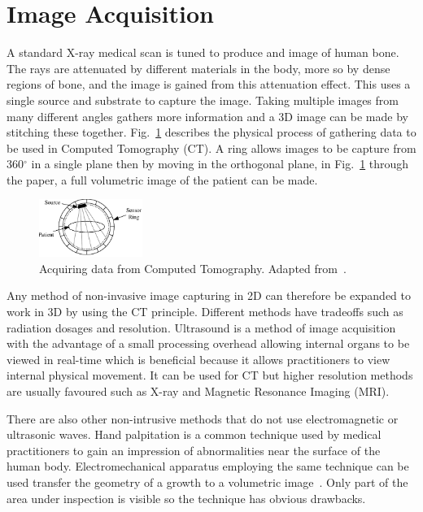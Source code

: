 \documentclass[journal]{IEEEtran}
\begin{document}
\section{Image Acquisition}
\label{sec:image}

A standard X-ray medical scan is tuned to produce and image of human bone.
The rays are attenuated by different materials in the body, more so by dense regions of bone, and the image is gained from this attenuation effect.  
This uses a single source and substrate to capture the image.
Taking multiple images from many different angles gathers more information and a 3D image can be made by stitching these together.
Fig.~\ref{fig:ct} describes the physical process of gathering data to be used in Computed Tomography (CT).
A ring allows images to be capture from 360$^{\circ}$ in a single plane then by moving in the orthogonal plane, in Fig.~\ref{fig:ct} through the paper, a full volumetric image of the patient can be made. 

\begin{figure}[!htb]
   \centering
   \includegraphics[width = 0.3\textwidth]{Figures/CT.pdf}
   \caption{Acquiring data from Computed Tomography. Adapted from~\cite{kayvan2006biomedical}.}
   \label{fig:ct}
\end{figure}

Any method of non-invasive image capturing in 2D can therefore be expanded to work in 3D by using the CT principle.
Different methods have tradeoffs such as radiation dosages and resolution.
Ultrasound is a method of image acquisition with the advantage of a small processing overhead allowing internal organs to be viewed in real-time which is beneficial because it allows practitioners to view internal physical movement. 
It can be used for CT but higher resolution methods are usually favoured such as X-ray and Magnetic Resonance Imaging (MRI).

There are also other non-intrusive methods that do not use electromagnetic or ultrasonic waves.
Hand palpitation is a common technique used by medical practitioners to gain an impression of abnormalities near the surface of the human body. 
Electromechanical apparatus employing the same technique can be used transfer the geometry of a growth to a volumetric image~\cite{liu09haptic,wellman1997modeling}.  
Only part of the area under inspection is visible so the technique has obvious drawbacks.
\end{document}

